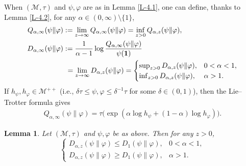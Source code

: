 \documentclass[12pt]{article}
\newtheorem{lemma}[theorem]{Lemma}
\theoremstyle{definition}
\theoremstyle{remark}
\numberwithin{equation}{section}
\def\Me{\mathcal M}
\def\ffi{\varphi}
\def\1{\mathbf{1}}
\begin{document}
When $(\Me,\tau)$ and $\psi,\ffi$ are as in Lemma \ref{L-4.1}, one can define, thanks to Lemma \ref{L-4.2},
for any $\alpha\in(0,\infty)\setminus\{1\}$,
\begin{align}
Q_{\alpha,\infty}(\psi\|\ffi)&:=\lim_{z\to\infty}Q_{\alpha,\infty}(\psi\|\ffi)
=\inf_{z>0}Q_{\alpha,z}(\psi\|\ffi), \nonumber\\
D_{\alpha,\infty}(\psi\|\ffi)&:={1\over\alpha-1}\log{Q_{\alpha,\infty}(\psi\|\ffi)\over\psi(\1)} \nonumber\\
&\ =\lim_{z\to\infty}D_{\alpha,z}(\psi\|\ffi)
=\begin{cases}\sup_{z>0}D_{\alpha,z}(\psi\|\ffi), & \text{$0<\alpha<1$},\\
\inf_{z>0}D_{\alpha,z}(\psi\|\ffi), & \text{$\alpha>1$}.\end{cases} \label{F-4.9}
\end{align}
If $h_\psi,h_\ffi\in\Me^{++}$ (i.e., $\delta\tau\le\psi,\ffi\le\delta^{-1}\tau$ for some $\delta\in(0,1)$), then
the Lie--Trotter formula gives
\begin{align}\label{F-4.10}
Q_{\alpha,\infty}(\psi\|\ffi)=\tau\bigl(\exp(\alpha\log h_\psi+(1-\alpha)\log h_\ffi)\bigr).
\end{align}

\begin{lemma}\label{L-4.3}
Let $(\Me,\tau)$ and $\psi,\ffi$ be as above. Then for any $z>0$,
\[
\begin{cases}
D_{\alpha,z}(\psi\|\ffi)\le D_1(\psi\|\ffi), & \text{$0<\alpha<1$},\\
D_{\alpha,z}(\psi\|\ffi)\ge D_1(\psi\|\ffi), & \text{$\alpha>1$}.
\end{cases}
\]
\end{lemma}
\end{document}
